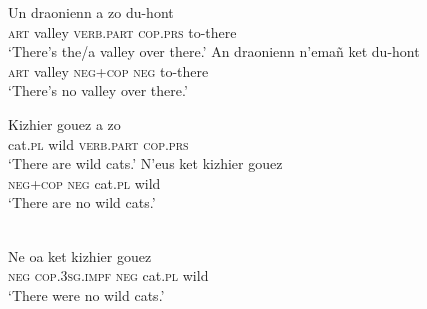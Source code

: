 ﻿\documentclass[output=paper]{langsci/langscibook}
\begin{document}
\begin{exe}\ex\label{ex:ieur-breton-valley}
\begin{xlist}
\ex\gll Un draonienn a zo du-hont \\
\textsc{art} valley \textsc{verb.part} \textsc{cop.prs} to-there \\
    \glt `There's the/a valley over there.' 
\ex\gll An draonienn n’emañ ket du-hont\\
\textsc{art} valley \textsc{neg+cop} \textsc{neg} to-there\\
\glt `There's no valley over there.' 
\end{xlist}
%
\ex\label{ex:ieur-breton-wildcats}
\begin{xlist}
\ex\gll Kizhier gouez a zo \\
cat.\textsc{pl} wild \textsc{verb.part} \textsc{cop.prs} \\
    \glt `There are wild cats.'
\ex\gll N’eus ket kizhier gouez \\
    \textsc{neg+cop} \textsc{neg} cat.\textsc{pl}   wild \\
    \glt `There are no wild cats.'
\end{xlist}
%
\ex\label{ex:ieur-breton-nowildcatspast}
\\
    \gll Ne oa ket kizhier gouez \\
\textsc{neg} \textsc{cop.3sg.impf} \textsc{neg} cat.\textsc{pl} wild \\
    \glt `There were no wild cats.'
\end{exe}
\end{document}

